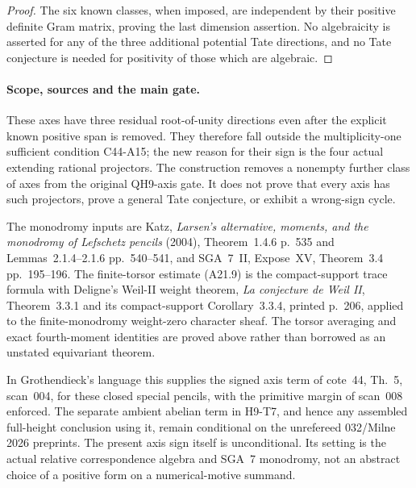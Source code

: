 \documentclass[11pt]{article}
\theoremstyle{remark}\newtheorem{remark}[theorem]{Remark}
\begin{document}
\begin{proof}
The six known classes, when imposed, are independent by their positive
definite Gram matrix, proving the last dimension assertion.  No
algebraicity is asserted for any of the three additional potential Tate
directions, and no Tate conjecture is needed for positivity of those
which are algebraic.
\end{proof}

\paragraph{Scope, sources and the main gate.}
These axes have three residual root-of-unity directions even after the
explicit known positive span is removed.  They therefore fall outside
the multiplicity-one sufficient condition C44-A15; the new reason for
their sign is the four actual extending rational projectors.  The
construction removes a nonempty further class of axes from the original
QH9-axis gate.  It does not prove that every axis has such projectors,
prove a general Tate conjecture, or exhibit a wrong-sign cycle.

The monodromy inputs are Katz, \emph{Larsen's alternative, moments, and
the monodromy of Lefschetz pencils} (2004), Theorem~1.4.6 p.~535 and
Lemmas~2.1.4--2.1.6 pp.~540--541, and SGA~7~II, Expose~XV,
Theorem~3.4 pp.~195--196.  The finite-torsor estimate (A21.9) is the
compact-support trace formula with Deligne's Weil-II weight theorem,
\emph{La conjecture de Weil II}, Theorem~3.3.1 and its compact-support
Corollary~3.3.4, printed p.~206, applied to the finite-monodromy weight-zero character
sheaf.  The torsor averaging and exact fourth-moment identities are
proved above rather than borrowed as an unstated equivariant theorem.

In Grothendieck's language this supplies the signed axis term of
cote~44, Th.~5, scan~004, for these closed special pencils, with the
primitive margin of scan~008 enforced.  The separate ambient abelian
term in H9-T7, and hence any assembled full-height conclusion using it,
remain conditional on the unrefereed 032/Milne 2026 preprints.  The
present axis sign itself is unconditional.  Its setting is the actual
relative correspondence algebra and SGA~7 monodromy, not an abstract
choice of a positive form on a numerical-motive summand.


\end{document}
